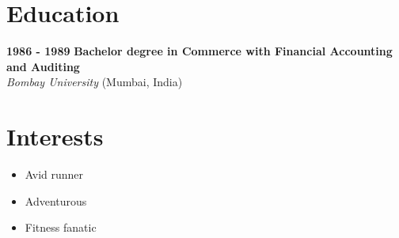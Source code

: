 \documentclass[11pt,a4paper]{article}
\newcommand{\cvitem}[1]{\item[\scriptsize$\bullet$] \footnotesize #1}
\newcommand{\educationentry}[4]{
  \textbf{#1} \hspace{1em} \textbf{#2} \\
  \textit{#3} \hspace{0.5em} (#4)
}
\begin{document}
\begin{minipage}[t]{0.63\textwidth}
\vspace{6pt}

\section*{Education}
\educationentry{1986 - 1989}{Bachelor degree in Commerce with Financial Accounting and Auditing}{Bombay University}{Mumbai, India}

\vspace{6pt}

\section*{Interests}
\begin{itemize}[label={}, leftmargin=0pt]
  \cvitem{Avid runner}
  \cvitem{Adventurous}
  \cvitem{Fitness fanatic}
\end{itemize}

\end{minipage}
\end{document}
